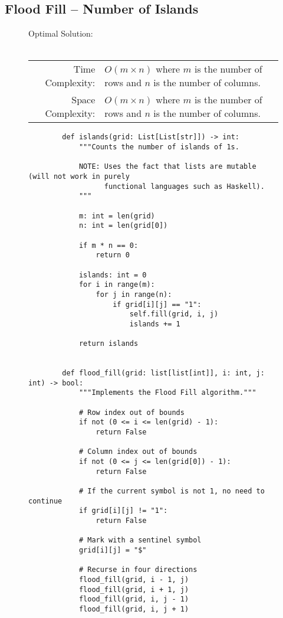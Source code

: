 
\subsection{Flood Fill -- Number of Islands}

\begin{figure}[H]
    Optimal Solution:\\\\
    \begin{tabular}{rl}
        Time Complexity:& \(O(m \times n)\) where \(m\) is the number of rows
        and \(n\) is the number of columns.\\
        Space Complexity:& \(O(m \times n)\) where \(m\) is the number of rows
        and \(n\) is the number of columns.
    \end{tabular}
\end{figure}

\begin{figure}[H]
    \centering
    \begin{verbatim}
        def islands(grid: List[List[str]]) -> int:
            """Counts the number of islands of 1s.

            NOTE: Uses the fact that lists are mutable (will not work in purely
                  functional languages such as Haskell).
            """

            m: int = len(grid)
            n: int = len(grid[0])

            if m * n == 0:
                return 0

            islands: int = 0
            for i in range(m):
                for j in range(n):
                    if grid[i][j] == "1":
                        self.fill(grid, i, j)
                        islands += 1

            return islands


        def flood_fill(grid: list[list[int]], i: int, j: int) -> bool:
            """Implements the Flood Fill algorithm."""

            # Row index out of bounds
            if not (0 <= i <= len(grid) - 1):
                return False

            # Column index out of bounds
            if not (0 <= j <= len(grid[0]) - 1):
                return False

            # If the current symbol is not 1, no need to continue
            if grid[i][j] != "1":
                return False

            # Mark with a sentinel symbol
            grid[i][j] = "$"

            # Recurse in four directions
            flood_fill(grid, i - 1, j)
            flood_fill(grid, i + 1, j)
            flood_fill(grid, i, j - 1)
            flood_fill(grid, i, j + 1)
    \end{verbatim}
\end{figure}
